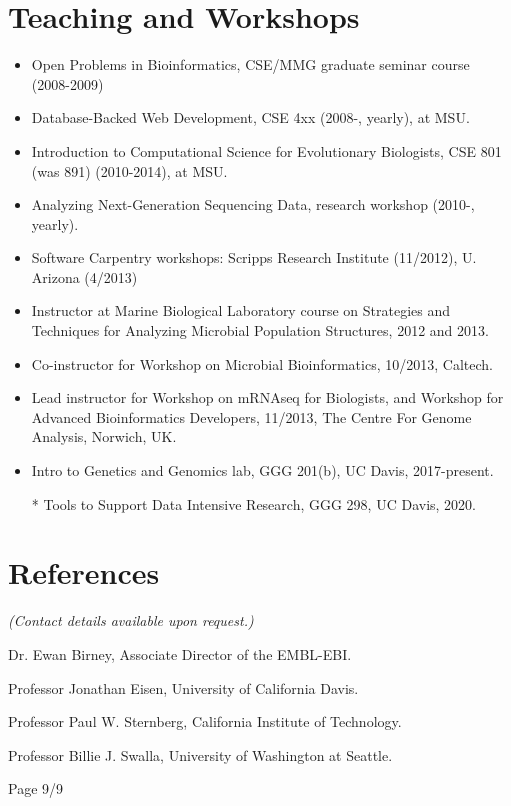 \documentclass[margin,line]{resume}
\begin{document}
\begin{resume}
\section{\mysidestyle Teaching and Workshops}

\begin{itemize}

\item Open Problems in Bioinformatics, CSE/MMG graduate seminar
  course (2008-2009)
\item Database-Backed Web Development, CSE 4xx (2008-, yearly), at MSU.
\item Introduction to Computational Science for Evolutionary Biologists, CSE 801 (was 891) (2010-2014), at MSU.
\item Analyzing Next-Generation Sequencing Data, research workshop (2010-, yearly).
\item Software Carpentry workshops: Scripps Research Institute (11/2012), U. Arizona (4/2013)
\item Instructor at Marine Biological Laboratory course on Strategies and Techniques for Analyzing Microbial Population Structures, 2012 and 2013.
\item Co-instructor for Workshop on Microbial Bioinformatics, 10/2013, Caltech.
\item Lead instructor for Workshop on mRNAseq for Biologists, and Workshop for Advanced Bioinformatics Developers, 11/2013, The Centre For Genome Analysis, Norwich, UK.
\item Intro to Genetics and Genomics lab, GGG 201(b), UC Davis, 2017-present.
\item[*] Tools to Support Data Intensive Research, GGG 298, UC Davis, 2020.
\end{itemize}

\section{\mysidestyle References}

{\em (Contact details available upon request.)}

Dr. Ewan Birney, Associate Director of the EMBL-EBI.

Professor Jonathan Eisen, University of California Davis.

Professor Paul W. Sternberg, California Institute of Technology.

Professor Billie J. Swalla, University of Washington at Seattle.

{\centerline {Page 9/9}}

\end{resume}
\end{document}
